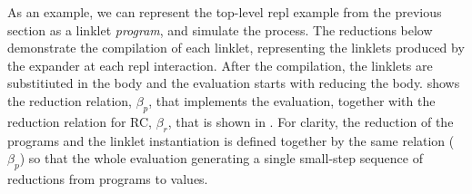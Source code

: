 As an example, we can represent the top-level repl example from the
previous section as a linklet \emph{program}, and simulate the
process. The reductions below demonstrate the compilation of each
linklet, representing the linklets produced by the expander at each
repl interaction. After the compilation, the linklets are substitiuted
in the body and the evaluation starts with reducing the
body.  shows the reduction relation, $\beta_p$, that
implements the evaluation, together with the reduction relation for
RC, $\beta_r$, that is shown in . For clarity,
the reduction of the programs and the linklet instantiation is defined
together by the same relation ($\beta_p$) so that the whole evaluation
generating a single small-step sequence of reductions from programs to
values.

